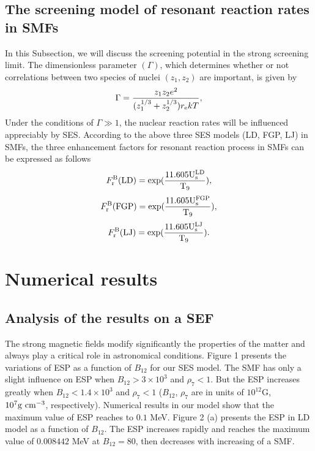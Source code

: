 \documentclass[manuscript]{aastex}
\begin{document}
\subsection{The screening model of resonant reaction rates in SMFs}

In this Subsection, we will discuss the screening potential in the
strong screening limit. The dimensionless parameter $(\Gamma)$,
which determines whether or not correlations between two species of
nuclei $(z_1, z_2)$ are important, is given by
\begin{equation}
\Gamma=\frac{z_1z_2e^2}{(z_1^{1/3}+z_2^{1/3})r_{\rm{e}}kT},
\label{48}
\end{equation}
Under the conditions of $\Gamma\gg1$, the nuclear reaction rates
will be influenced appreciably by SES. According to the above three
SES models (LD, FGP, LJ) in SMFs, the three enhancement factors for
resonant reaction process in SMFs can be expressed as follows
\begin{equation}
F_{\rm{r}}^{\rm{B}}(\rm{LD})=\exp(\frac{11.605U_{\rm{s}}^{\rm{LD}}}{T_9}),
\label{49}
\end{equation}
\begin{equation}
F_{\rm{r}}^{\rm{B}}(\rm{FGP})=\exp(\frac{11.605U_{\rm{s}}^{\rm{FGP}}}{T_9}),
\label{50}
\end{equation}
\begin{equation}
F_{\rm{r}}^{\rm{B}}(\rm{LJ})=\exp(\frac{11.605U_{\rm{s}}^{\rm{LJ}}}{T_9}).
\label{51}
\end{equation}



\section{Numerical results}

\subsection{Analysis of the results on a SEF}

The strong magnetic fields modify significantly the properties of
the matter and always play a critical role in astronomical
conditions. Figure 1 presents the variations of ESP as a function of
$B_{12}$ for our SES model. The SMF has only a slight influence on
ESP when $B_{12}>3\times10^3$ and $\rho_7<1$. But the ESP increases
greatly when $B_{12}<1.4 \times10^3$ and $\rho_7<1$ ($B_{12}$,
$\rho_7$ are in units of $10^{12}$G, $10^7\rm{g~cm^{-3}}$,
respectively). Numerical results in our model show that the maximum
value of ESP reaches to $0.1$ MeV. Figure 2 (a) presents the ESP in
LD model as a function of $B_{12}$. The ESP increases rapidly and
reaches the maximum value of $0.008442$ MeV at $B_{12}=80$, then
decreases with increasing of a SMF.
\end{document}
